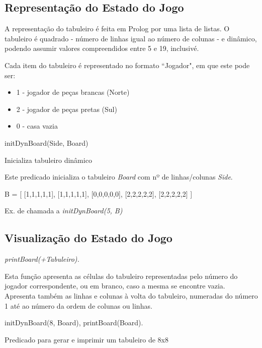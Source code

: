 \documentclass[15pt,a4paper]{article}
\begin{document}

\subsection{Representação do Estado do Jogo}

A representação do tabuleiro é feita em Prolog por uma lista de listas.
O tabuleiro é quadrado - número de linhas igual ao número de colunas - e dinâmico, podendo assumir valores compreendidos entre 5 e 19, inclusivé.

Cada item do tabuleiro é representado no formato ``Jogador", em que este pode ser:
\begin{itemize}
\item 1 - jogador de peças brancas (Norte)
\item 2 - jogador de peças pretas (Sul)
\item 0 - casa vazia
\end{itemize}

\begin{code}[H]
	\begin{verbatimtab}
initDynBoard(Side, Board)
\end{verbatimtab}
\caption{Inicializa tabuleiro dinâmico}
\end{code}

Este predicado inicializa o tabuleiro \textit{Board} com nº de linhas/colunas \textit{Side}.

\begin{code}[H]
	\begin{verbatimtab}
B = [
	[1,1,1,1,1],
	[1,1,1,1,1],
	[0,0,0,0,0],
	[2,2,2,2,2],
	[2,2,2,2,2]
	]
\end{verbatimtab}
\caption{Ex. de chamada a \textit{initDynBoard(5, B)}}
\end{code}


\subsection{Visualização do Estado do Jogo}

\textit{printBoard(+Tabuleiro).}

Esta função apresenta as células do tabuleiro representadas pelo número do jogador correspondente, ou em branco, caso a mesma se encontre vazia.
Apresenta também as linhas e colunas à volta do tabuleiro, numeradas do número 1 até ao número da ordem de colunas ou linhas.
\begin{code}[H]
	\begin{verbatimtab}
initDynBoard(8, Board),
printBoard(Board).
\end{verbatimtab}
\caption{Predicado para gerar e imprimir um tabuleiro de 8x8}
\end{code}
\end{document}
